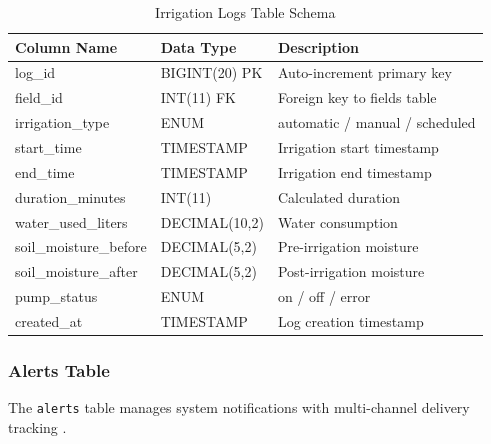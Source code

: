 \begin{table}[H]
\centering
\small
\begin{tabular}{|l|l|p{5.5cm}|}
\hline
\textbf{Column Name} & \textbf{Data Type} & \textbf{Description} 
\\ \hline
log\_id & BIGINT(20) PK & Auto-increment primary key \\ \hline
field\_id & INT(11) FK & Foreign key to fields table \\ \hline
irrigation\_type & ENUM & automatic / manual / scheduled \\ \hline
start\_time & TIMESTAMP & Irrigation start timestamp \\ \hline
end\_time & TIMESTAMP & Irrigation end timestamp \\ \hline
duration\_minutes & INT(11) & Calculated duration \\ \hline
water\_used\_liters & DECIMAL(10,2) & Water consumption \\ \hline
soil\_moisture\_before & DECIMAL(5,2) & Pre-irrigation moisture 
\\ \hline
soil\_moisture\_after & DECIMAL(5,2) & Post-irrigation moisture 
\\ \hline
pump\_status & ENUM & on / off / error \\ \hline
created\_at & TIMESTAMP & Log creation timestamp \\ \hline
\end{tabular}
\caption{Irrigation Logs Table Schema}
\label{tab:irrigation-logs-schema}
\end{table}

\subsubsection{Alerts Table}
The \texttt{alerts} table manages system notifications with 
multi-channel delivery tracking \cite{khawas2018firebase}.

